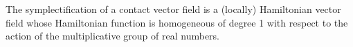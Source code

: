 The symplectification of a contact vector field is a (locally) Hamiltonian vector field whose Hamiltonian function is homogeneous of degree 1 with respect to the action of the multiplicative group of real numbers.
